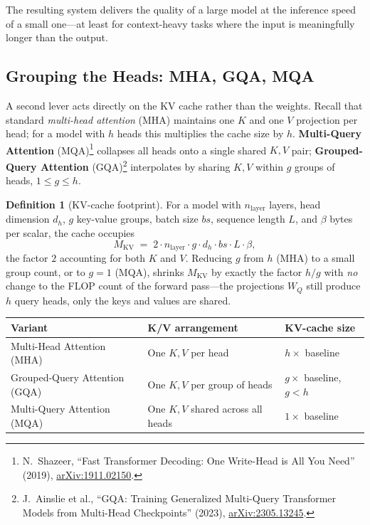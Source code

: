 \documentclass[11pt,a4paper]{article}
\theoremstyle{definition}
\newtheorem{definition}{Definition}[section]
\theoremstyle{remark}
\theoremstyle{plain}
\newcommand{\arxivlink}[1]{\href{https://arxiv.org/abs/#1}{arXiv:#1}}
\begin{document}
The resulting system delivers the quality of a large model at the
inference speed of a small one---at least for context-heavy tasks where
the input is meaningfully longer than the output.

\subsection{Grouping the Heads: MHA, GQA, MQA}

A second lever acts directly on the KV cache rather than the weights.
Recall that standard \emph{multi-head attention} (MHA) maintains one $K$
and one $V$ projection per head; for a model with $h$ heads this
multiplies the cache size by $h$. \textbf{Multi-Query Attention}
(MQA)\footnote{N.\ Shazeer, ``Fast Transformer Decoding: One Write-Head is
All You Need'' (2019), \arxivlink{1911.02150}.} collapses all heads onto a
single shared $K,V$ pair; \textbf{Grouped-Query Attention}
(GQA)\footnote{J.\ Ainslie et al., ``GQA: Training Generalized Multi-Query
Transformer Models from Multi-Head Checkpoints'' (2023),
\arxivlink{2305.13245}.} interpolates by sharing $K,V$ within $g$ groups
of heads, $1 \le g \le h$.

\begin{definition}[KV-cache footprint]
For a model with $n_{\text{layer}}$ layers, head dimension $d_h$, $g$
key-value groups, batch size $bs$, sequence length $L$, and $\beta$ bytes
per scalar, the cache occupies
\begin{equation}
  M_{\text{KV}} \;=\; 2 \cdot n_{\text{layer}} \cdot g \cdot d_h \cdot bs \cdot L \cdot \beta,
  \label{eq:kv-size}
\end{equation}
the factor $2$ accounting for both $K$ and $V$. Reducing $g$ from $h$
(MHA) to a small group count, or to $g=1$ (MQA), shrinks $M_{\text{KV}}$
by exactly the factor $h/g$ with \emph{no} change to the FLOP count of the
forward pass---the projections $W_Q$ still produce $h$ query heads, only
the keys and values are shared.
\end{definition}

\begin{center}
\renewcommand{\arraystretch}{1.25}
\begin{tabular}{@{}lll@{}}
\toprule
\textbf{Variant} & \textbf{K/V arrangement} & \textbf{KV-cache size} \\
\midrule
Multi-Head Attention (MHA)    & One $K,V$ per head                  & $h \times$ baseline \\
Grouped-Query Attention (GQA) & One $K,V$ per group of heads        & $g \times$ baseline, $g < h$ \\
Multi-Query Attention (MQA)   & One $K,V$ shared across all heads   & $1 \times$ baseline \\
\bottomrule
\end{tabular}
\end{center}
\end{document}
